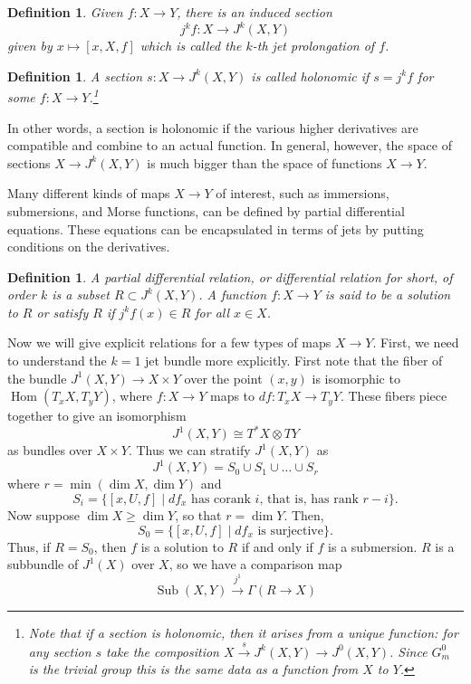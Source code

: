 \documentclass{article}
\newtheorem{definition}[theorem]{Definition}
\newtheorem{proposed work}[theorem]{Proposed Work}
\theoremstyle{definition}
\DeclareMathOperator{\Hom}{Hom}
\DeclareMathOperator{\Sub}{Sub}
\begin{document}
\begin{definition}
Given $f: X \to Y$, there is an induced section 
\[
j^kf: X \to J^k(X,Y)
\]
given by $x \mapsto [x, X, f]$ which is called the \textit{$k$-th jet prolongation} of $f$.
\end{definition}
\begin{definition}
A section $s: X\to J^k(X,Y)$ is called \textit{holonomic} if $s=j^kf$ for some $f:X\to Y$.\footnote{Note that if a section is holonomic, then it arises from a unique function: for any section $s$ take the composition $X \xrightarrow{s} J^k(X,Y) \to J^0(X,Y)$.  Since $G^0_m$ is the trivial group this is the same data as a function from $X$ to $Y$.}
\end{definition}
In other words, a section is holonomic if the various higher derivatives are compatible and combine to an actual function. In general, however, the space of sections $X\to J^k(X,Y)$ is much bigger than the space of functions $X\to Y$.

Many different kinds of maps $X\to Y$ of interest, such as immersions, submersions, and Morse functions, can be defined by partial differential equations. These equations can be encapsulated in terms of jets by putting conditions on the derivatives.
\begin{definition}
A \textit{partial differential relation}, or \textit{differential relation} for short, of order $k$ is a subset $R \subset J^k(X,Y)$.
A function $f:X \to Y$ is said to be a \textit{solution} to $R$ or satisfy $R$ if $j^k f(x) \in R$ for all $x \in X$.
\end{definition}
Now we will give explicit relations for a few types of maps $X\to Y$. First, we need to understand the $k=1$ jet bundle more explicitly. First note that the fiber of the bundle $J^1(X,Y)\to X\times Y$ over the point $(x,y)$ is isomorphic to $\Hom(T_xX, T_yY)$, where $f:X\to Y$ maps to $df: T_xX\to T_yY$. These fibers piece together to give an isomorphism
\[
J^1(X,Y) \cong T^*X\otimes TY
\]
as bundles over $X\times Y$. Thus we can stratify $J^1(X,Y)$ as
\[
J^1(X,Y) = S_0\cup S_1\cup\ldots \cup S_r
\]
where $r=\min(\dim X,\dim Y)$ and
\[
S_i = \{[x,U,f] \mid df_x\text{ has corank }i\text{, that is, has rank }r-i\}.
\]
Now suppose $\dim X\ge \dim Y$, so that $r=\dim Y$. Then, 
\[
S_0 = \{[x,U,f] \mid df_x\text{ is surjective}\}.
\]
Thus, if $R=S_0$, then $f$ is a solution to $R$ if and only if $f$ is a submersion. $R$ is a subbundle of $J^1(X)$ over $X$, so we have a comparison map
$$\Sub(X,Y)\xrightarrow{j^1}\Gamma(R\to X)$$
\end{document}
